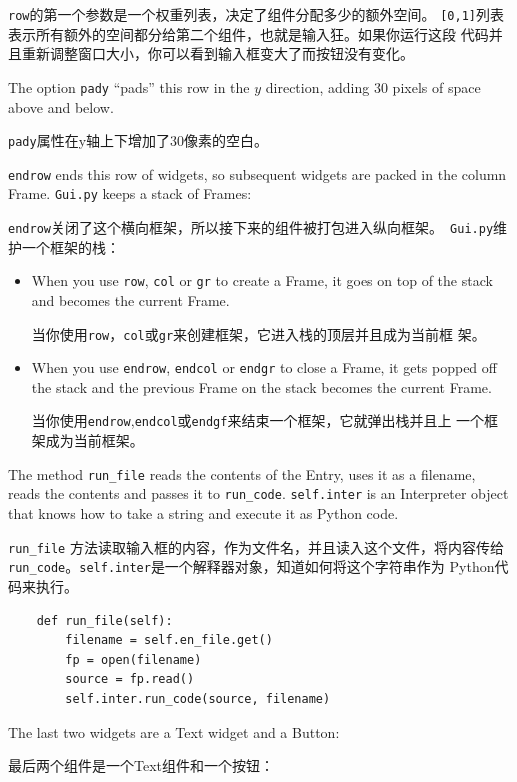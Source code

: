 \documentclass[10pt]{book}
\begin{document}
\begin{CJK}{UTF8}{gbsn}
{\tt row}的第一个参数是一个权重列表，决定了组件分配多少的额外空间。
{\tt [0,1]}列表表示所有额外的空间都分给第二个组件，也就是输入狂。如果你运行这段
代码并且重新调整窗口大小，你可以看到输入框变大了而按钮没有变化。

The option {\tt pady} ``pads'' this row in the $y$ direction,
adding 30 pixels of space above and below.

{\tt pady}属性在y轴上下增加了30像素的空白。

{\tt endrow} ends this row of widgets, so subsequent widgets are
packed in the column Frame.  {\tt Gui.py} keeps a stack of Frames:

{\tt endrow}关闭了这个横向框架，所以接下来的组件被打包进入纵向框架。{\tt
Gui.py}维护一个框架的栈：

\begin{itemize}

\item When you use {\tt row}, {\tt col} or {\tt gr} to create a Frame,
it goes on top of the stack and becomes the current Frame.

当你使用{\tt row}，{\tt col}或{\tt gr}来创建框架，它进入栈的顶层并且成为当前框
架。

\item When you use {\tt endrow}, {\tt endcol} or {\tt endgr} to close
a Frame, it gets popped off the stack and the previous Frame on the
stack becomes the current Frame.

当你使用{\tt endrow},{\tt endcol}或{\tt endgf}来结束一个框架，它就弹出栈并且上
一个框架成为当前框架。

\end{itemize} 

The method \verb"run_file" reads the contents of the Entry,
uses it as a filename, reads the contents
and passes it to \verb"run_code".  {\tt self.inter} is an
Interpreter object that knows how to take a string and
execute it as Python code.

\verb"run_file" 方法读取输入框的内容，作为文件名，并且读入这个文件，将内容传给
\verb"run_code"。{\tt self.inter}是一个解释器对象，知道如何将这个字符串作为
Python代码来执行。

\begin{verbatim}
    def run_file(self):
        filename = self.en_file.get()
        fp = open(filename)
        source = fp.read()
        self.inter.run_code(source, filename)
\end{verbatim}
%
The last two widgets are a Text widget and a Button:

最后两个组件是一个Text组件和一个按钮：


\end{CJK}
\end{document}
